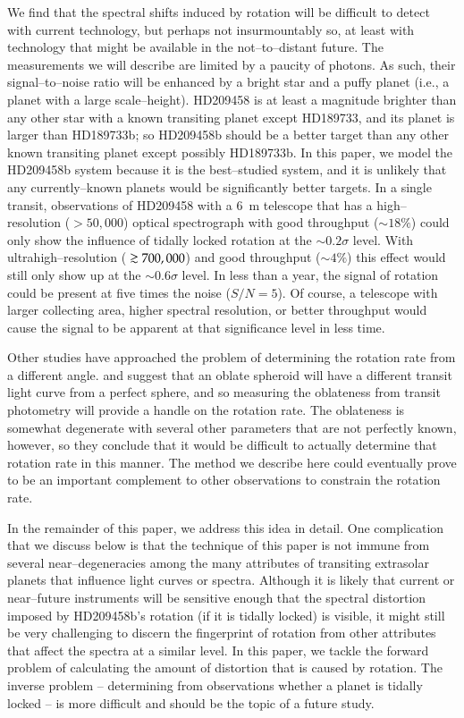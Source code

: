 We find that the spectral shifts induced by rotation will be difficult
to detect with current technology, but perhaps not insurmountably so,
at least with technology that might be available in the
not--to--distant future.  The measurements we will describe are
limited by a paucity of photons.  As such, their signal--to--noise
ratio will be enhanced by a bright star and a puffy planet (i.e., a
planet with a large scale--height).  HD209458 is at least a magnitude
brighter than any other star with a known transiting planet except
HD189733, and its planet is larger than HD189733b; so HD209458b should
be a better target than any other known transiting planet except
possibly HD189733b.  In this paper, we model the HD209458b system
because it is the best--studied system, and it is unlikely that any
currently--known planets would be significantly better targets.  In a
single transit, observations of HD209458 with a 6~m telescope that has
a high--resolution ($>50,000$) optical spectrograph with good
throughput ($\sim 18\%$) could only show the influence of tidally
locked rotation at the $\sim 0.2\sigma$ level.  With
ultrahigh--resolution ($\gsim 700,000$) and good throughput ($\sim
4\%$) this effect would still only show up at the $\sim 0.6 \sigma$
level.  In less than a year, the signal of rotation could be present
at five times the noise ($S/N = 5$).  Of course, a telescope with
larger collecting area, higher spectral resolution, or better
throughput would cause the signal to be apparent at that significance
level in less time.

Other studies have approached the problem of determining the rotation
rate from a different angle.  \citet{seager+hui2002} and
\citet{barnes+fortney2003} suggest that an oblate spheroid will have a
different transit light curve from a perfect sphere, and so measuring
the oblateness from transit photometry will provide a handle on the
rotation rate.  The oblateness is somewhat degenerate with several
other parameters that are not perfectly known, however, so they
conclude that it would be difficult to actually determine that
rotation rate in this manner.  The method we describe here could
eventually prove to be an important complement to other observations
to constrain the rotation rate.

In the remainder of this paper, we address this idea in detail.  One
complication that we discuss below is that the technique of this paper
is not immune from several near--degeneracies among the many
attributes of transiting extrasolar planets that influence light
curves or spectra.  Although it is likely that current or near--future
instruments will be sensitive enough that the spectral distortion
imposed by HD209458b's rotation (if it is tidally locked) is visible,
it might still be very challenging to discern the fingerprint of
rotation from other attributes that affect the spectra at a similar
level.  In this paper, we tackle the forward problem of calculating
the amount of distortion that is caused by rotation.  The inverse
problem -- determining from observations whether a planet is tidally
locked -- is more difficult and should be the topic of a future study.

